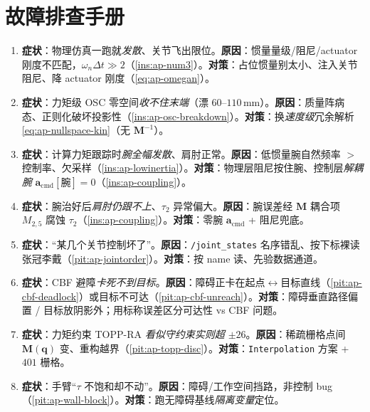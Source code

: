 \section*{故障排查手册}
\begin{enumerate}
  \item \textbf{症状}：物理仿真一跑就\emph{发散}、关节飞出限位。\textbf{原因}：惯量量级/阻尼/actuator 刚度不匹配，$\omega_n\Delta t\gg2$（\cref{ins:ap-num3}）。\textbf{对策}：占位惯量别太小、注入关节阻尼、降 actuator 刚度（\cref{eq:ap-omegan}）。
  \item \textbf{症状}：力矩级 OSC 零空间\emph{收不住末端}（漂 $60$--$110\,\mathrm{mm}$）。\textbf{原因}：质量阵病态、正则化破坏投影性（\cref{ins:ap-osc-breakdown}）。\textbf{对策}：换\emph{速度级}冗余解析 \cref{eq:ap-nullspace-kin}（无 $\mathbf{M}^{-1}$）。
  \item \textbf{症状}：计算力矩跟踪时\emph{腕全幅发散}、肩肘正常。\textbf{原因}：低惯量腕自然频率 $>$ 控制率、欠采样（\cref{ins:ap-lowinertia}）。\textbf{对策}：物理层阻尼按住腕、控制层\emph{解耦腕} $\mathbf{a}_{\mathrm{cmd}}[\text{腕}]=0$（\cref{ins:ap-coupling}）。
  \item \textbf{症状}：腕治好后\emph{肩肘仍跟不上}、$\tau_2$ 异常偏大。\textbf{原因}：腕误差经 $\mathbf{M}$ 耦合项 $M_{2,5}$ 腐蚀 $\tau_2$（\cref{ins:ap-coupling}）。\textbf{对策}：零腕 $\mathbf{a}_{\mathrm{cmd}}$ + 阻尼兜底。
  \item \textbf{症状}：“某几个关节控制坏了”。\textbf{原因}：\texttt{/\allowbreak joint\_states} 名序错乱、按下标裸读张冠李戴（\cref{pit:ap-jointorder}）。\textbf{对策}：按 name 读、先验数据通道。
  \item \textbf{症状}：CBF 避障\emph{卡死不到目标}。\textbf{原因}：障碍正卡在起点$\leftrightarrow$目标直线（\cref{pit:ap-cbf-deadlock}）或目标不可达（\cref{pit:ap-cbf-unreach}）。\textbf{对策}：障碍垂直路径偏置 / 目标放阴影外；用标称误差区分可达性 vs CBF 问题。
  \item \textbf{症状}：力矩约束 TOPP-RA \emph{看似守约束实则超 $\pm26$}。\textbf{原因}：稀疏栅格点间 $\mathbf{M}(\mathbf{q})$ 变、重构越界（\cref{pit:ap-topp-disc}）。\textbf{对策}：\texttt{Interpolation} 方案 + $401$ 栅格。
  \item \textbf{症状}：手臂“$\tau$ 不饱和却不动”。\textbf{原因}：障碍/工作空间挡路，非控制 bug（\cref{pit:ap-wall-block}）。\textbf{对策}：跑无障碍基线\emph{隔离变量}定位。
\end{enumerate}
